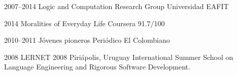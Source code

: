 
\cventry
{2007--2014}
{Logic and Computation Research Group}
{Universidad EAFIT}
{}
{}
{}

\cventry
{2014}
{Moralities of Everyday Life}
{Coursera}
{}
{91.7/100}
{}

\cventry
{2010--2011}
{Jóvenes pioneros}
{Periódico El Colombiano}
{}
{}
{}

\cventry
{2008}
{LERNET 2008}
{}
{Piriápolis, Uruguay}
{}
{International Summer School on Language Engineering and
  Rigorous Software Development.}
